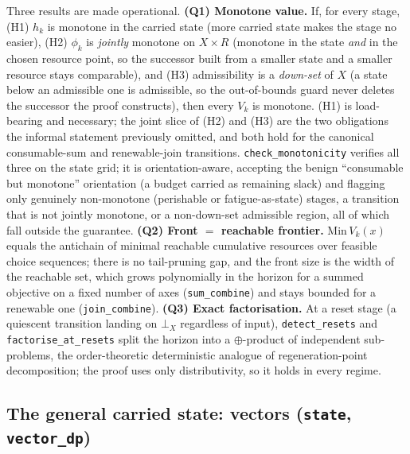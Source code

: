 \documentclass[11pt,a4paper]{article}
\begin{document}
Three results are made operational. \textbf{(Q1) Monotone value.} If, for
every stage, (H1) $h_k$ is monotone in the carried state (more carried
state makes the stage no easier), (H2) $\phi_k$ is \emph{jointly} monotone
on $X\times R$ (monotone in the state \emph{and} in the chosen resource
point, so the successor built from a smaller state and a smaller resource
stays comparable), and (H3) admissibility is a \emph{down-set} of $X$ (a
state below an admissible one is admissible, so the out-of-bounds guard
never deletes the successor the proof constructs), then every $V_k$ is
monotone. (H1) is load-bearing and necessary; the joint slice of (H2) and
(H3) are the two obligations the informal statement previously omitted, and
both hold for the canonical consumable-sum and renewable-join transitions.
\texttt{check\_monotonicity} verifies all three on the state grid; it is
orientation-aware, accepting the benign ``consumable but monotone''
orientation (a budget carried as remaining slack) and flagging only
genuinely non-monotone (perishable or fatigue-as-state) stages, a transition
that is not jointly monotone, or a non-down-set admissible region, all of
which fall outside the guarantee.
\textbf{(Q2) Front $=$ reachable frontier.} $\mathrm{Min}\,V_k(x)$ equals
the antichain of minimal reachable cumulative resources over feasible
choice sequences; there is no tail-pruning gap, and the front size is the
width of the reachable set, which grows polynomially in the horizon for a
summed objective on a fixed number of axes (\texttt{sum\_combine}) and
stays bounded for a renewable one (\texttt{join\_combine}).
\textbf{(Q3) Exact factorisation.} At a reset stage (a quiescent
transition landing on $\bot_X$ regardless of input),
\texttt{detect\_resets} and \texttt{factorise\_at\_resets} split the
horizon into a $\oplus$-product of independent sub-problems, the
order-theoretic deterministic analogue of regeneration-point
decomposition; the proof uses only distributivity, so it holds in every
regime.

\subsection{The general carried state: vectors (\texttt{state}, \texttt{vector\_dp})}
\label{sec:vector}
\end{document}
